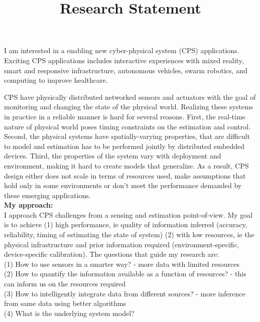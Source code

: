 \documentclass[10pt]{article}
\date{}
\begin{document}

\setlength{\droptitle}{-5em}

\title{{\Large  Research Statement}}
\maketitle

\vspace{-4em}

I am interested in a enabling new cyber-physical system (CPS) applications. Exciting CPS applications includes interactive experiences with mixed reality, smart and responsive infrastructure, autonomous vehicles, swarm robotics, and computing to improve healthcare.

CPS have physically distributed networked sensors and actuators with the goal of monitoring and changing the state of the physical world. Realizing these systems in practice in a reliable manner is hard for several reasons. First, the real-time nature of physical world poses timing constraints on the estimation and control. Second, the physical systems have spatially-varying properties, that are difficult to model and estimation has to be performed jointly by distributed embedded devices. Third, the properties of the system vary with deployment and environment, making it hard to create models that generalize. As a result, CPS design either does not scale in terms of resources used, make assumptions that hold only in some environments or don't meet the performance demanded by these emerging applications.\\

\textbf{My approach:}\\
I approach CPS challenges from a sensing and estimation point-of-view. My goal is to achieve (1) high performance, ie quality of information inferred (accuracy, reliability, timing of estimating the state of system) (2) with low resources, ie the physical infrastructure and prior information required (environment-specific, device-specific calibration). %
The questions that guide my research are:\\
(1) How to use sensors in a smarter way? - more data with limited resources\\
(2) How to quantify the information available as a function of resources? - this can inform us on the resources required\\
(3) How to intelligently integrate data from different sources? - more inference from same data using better algorithms\\
(4) What is the underlying system model?
\end{document}
